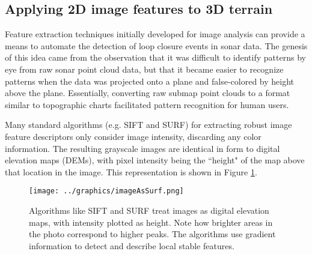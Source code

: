 
\subsection{Applying 2D image features to 3D terrain}



Feature extraction techniques initially developed for image analysis can provide a means to automate the detection of loop closure events in sonar data. The genesis of this idea came from the observation that it was difficult to identify patterns by eye from raw sonar point cloud data, but that it became easier to recognize patterns when the data was projected onto a plane and false-colored by height above the plane. Essentially, converting raw submap point clouds to a format similar to topographic charts facilitated pattern recognition for human users.

Many standard algorithms (e.g. SIFT and SURF) for extracting robust image feature descriptors only consider image intensity, discarding any color information. The resulting grayscale images are identical in form to digital elevation maps (DEMs), with pixel intensity being the ``height" of the map above that location in the image. This representation is shown in Figure \ref{fig:imAsSurf}. 

\begin{figure}[htb]
   \centering
   \texttt{[image: ../graphics/imageAsSurf.png]} %
   \caption{Algorithms like SIFT and SURF treat images as digital elevation maps, with intensity plotted as height. Note how brighter areas in the photo correspond to higher peaks. The algorithms use gradient information to detect and describe local stable features.}
   \label{fig:imAsSurf}
\end{figure}

